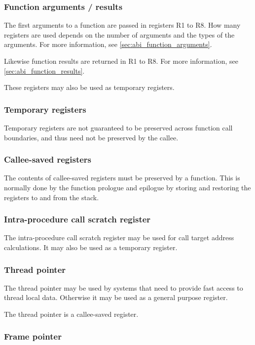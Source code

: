 \subsubsection{Function arguments / results}

The first arguments to a function are passed in registers R1 to R8. How many
registers are used depends on the number of arguments and the types of the
arguments. For more information, see \ref{sec:abi_function_arguments}.

Likewise function results are returned in R1 to R8. For more information, see
\ref{sec:abi_function_results}.

These registers may also be used as temporary registers.

\subsubsection{Temporary registers}

Temporary registers are not guaranteed to be preserved across function call
boundaries, and thus need not be preserved by the callee.

\subsubsection{Callee-saved registers}

The contents of callee-saved registers must be preserved by a function. This is
normally done by the function prologue and epilogue by storing and restoring
the registers to and from the stack.

\subsubsection{Intra-procedure call scratch register}

The intra-procedure call scratch register may be used for call target address
calculations. It may also be used as a temporary register.

\subsubsection{Thread pointer}

The thread pointer may be used by systems that need to provide fast access to
thread local data. Otherwise it may be used as a general purpose register.

The thread pointer is a callee-saved register.

\subsubsection{Frame pointer}

